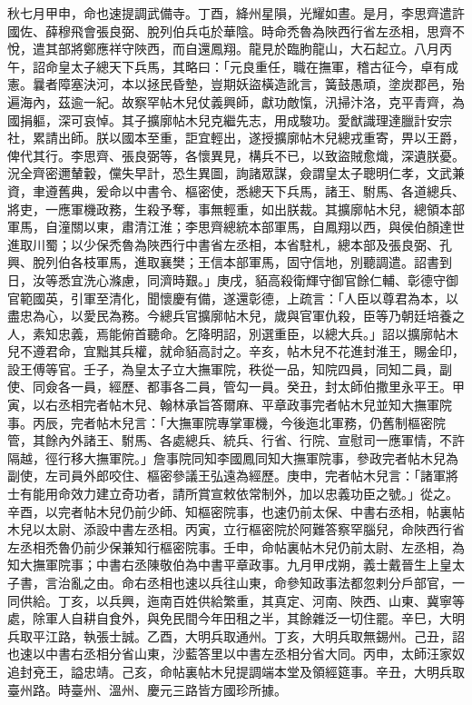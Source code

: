 \begin{pinyinscope}
 秋七月甲申，命也速提調武備寺。丁酉，絳州星隕，光耀如晝。是月，李思齊遣許國佐、薛穆飛會張良弼、脫列伯兵屯於華陰。時命禿魯為陜西行省左丞相，思齊不悅，遣其部將鄭應祥守陜西，而自還鳳翔。龍見於臨朐龍山，大石起立。八月丙午，詔命皇太子總天下兵馬，其略曰：「元良重任，職在撫軍，稽古征今，卓有成憲。曩者障塞決河，本以拯民昏墊，豈期妖盜橫造訛言，簧鼓愚頑，塗炭郡邑，殆遍海內，茲逾一紀。故察罕帖木兒仗義興師，獻功敵愾，汛掃汴洛，克平青齊，為國捐軀，深可哀悼。其子擴廓帖木兒克繼先志，用成駿功。愛猷識理達臘計安宗社，累請出師。朕以國本至重，詎宜輕出，遂授擴廓帖木兒總戎重寄，畀以王爵，俾代其行。李思齊、張良弼等，各懷異見，構兵不已，以致盜賊愈熾，深遺朕憂。況全齊密邇輦轂，儻失早計，恐生異圖，詢諸眾謀，僉謂皇太子聰明仁孝，文武兼資，聿遵舊典，爰命以中書令、樞密使，悉總天下兵馬，諸王、駙馬、各道總兵、將吏，一應軍機政務，生殺予奪，事無輕重，如出朕裁。其擴廓帖木兒，總領本部軍馬，自潼關以東，肅清江淮；李思齊總統本部軍馬，自鳳翔以西，與侯伯顏達世進取川蜀；以少保禿魯為陜西行中書省左丞相，本省駐札，總本部及張良弼、孔興、脫列伯各枝軍馬，進取襄樊；王信本部軍馬，固守信地，別聽調遣。詔書到日，汝等悉宜洗心滌慮，同濟時艱。」庚戌，貊高殺衛輝守御官餘仁輔、彰德守御官範國英，引軍至清化，聞懷慶有備，遂還彰德，上疏言：「人臣以尊君為本，以盡忠為心，以愛民為務。今總兵官擴廓帖木兒，歲與官軍仇殺，臣等乃朝廷培養之人，素知忠義，焉能俯首聽命。乞降明詔，別選重臣，以總大兵。」詔以擴廓帖木兒不遵君命，宜黜其兵權，就命貊高討之。辛亥，帖木兒不花進封淮王，賜金印，設王傅等官。壬子，為皇太子立大撫軍院，秩從一品，知院四員，同知二員，副使、同僉各一員，經歷、都事各二員，管勾一員。癸丑，封太師伯撒里永平王。甲寅，以右丞相完者帖木兒、翰林承旨答爾麻、平章政事完者帖木兒並知大撫軍院事。丙辰，完者帖木兒言：「大撫軍院專掌軍機，今後迤北軍務，仍舊制樞密院管，其餘內外諸王、駙馬、各處總兵、統兵、行省、行院、宣慰司一應軍情，不許隔越，徑行移大撫軍院。」詹事院同知李國鳳同知大撫軍院事，參政完者帖木兒為副使，左司員外郎咬住、樞密參議王弘遠為經歷。庚申，完者帖木兒言：「諸軍將士有能用命效力建立奇功者，請所賞宣敕依常制外，加以忠義功臣之號。」從之。辛酉，以完者帖木兒仍前少師、知樞密院事，也速仍前太保、中書右丞相，帖裏帖木兒以太尉、添設中書左丞相。丙寅，立行樞密院於阿難答察罕腦兒，命陜西行省左丞相禿魯仍前少保兼知行樞密院事。壬申，命帖裏帖木兒仍前太尉、左丞相，為知大撫軍院事；中書右丞陳敬伯為中書平章政事。九月甲戌朔，義士戴晉生上皇太子書，言治亂之由。命右丞相也速以兵往山東，命參知政事法都忽剌分戶部官，一同供給。丁亥，以兵興，迤南百姓供給繁重，其真定、河南、陜西、山東、冀寧等處，除軍人自耕自食外，與免民間今年田租之半，其餘雜泛一切住罷。辛巳，大明兵取平江路，執張士誠。乙酉，大明兵取通州。丁亥，大明兵取無錫州。己丑，詔也速以中書右丞相分省山東，沙藍答里以中書左丞相分省大同。丙申，太師汪家奴追封兗王，謚忠靖。己亥，命帖裏帖木兒提調端本堂及領經筵事。辛丑，大明兵取臺州路。時臺州、溫州、慶元三路皆方國珍所據。




\end{pinyinscope}
